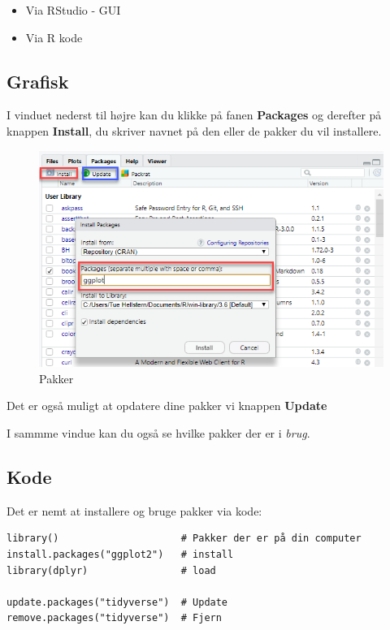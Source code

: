 \documentclass[
]{book}
\providecommand{\tightlist}{%
  \setlength{\itemsep}{0pt}\setlength{\parskip}{0pt}}
\begin{document}
\begin{itemize}
\tightlist
\item
  Via RStudio - GUI
\item
  Via R kode
\end{itemize}

\hypertarget{grafisk}{%
\subsection{Grafisk}\label{grafisk}}

I vinduet nederst til højre kan du klikke på fanen \textbf{Packages} og derefter på knappen \textbf{Install}, du skriver navnet på den eller de pakker du vil installere.

\begin{figure}
\centering
\includegraphics{img/pakker.png}
\caption{Pakker}
\end{figure}

Det er også muligt at opdatere dine pakker vi knappen \textbf{Update}

I sammme vindue kan du også se hvilke pakker der er i \emph{brug}.

\hypertarget{kode}{%
\subsection{Kode}\label{kode}}

Det er nemt at installere og bruge pakker via kode:

\begin{verbatim}
library()                     # Pakker der er på din computer
install.packages("ggplot2")   # install
library(dplyr)                # load

update.packages("tidyverse")  # Update
remove.packages("tidyverse")  # Fjern
\end{verbatim}
\end{document}
